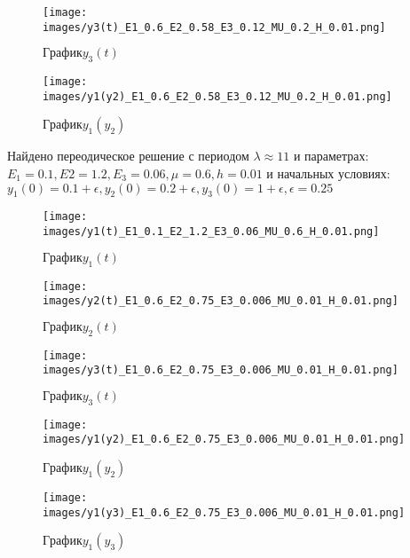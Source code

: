 \documentclass[a4paper,12pt,titlepage,finall]{article}
\begin{document}
\begin{itemize}
\newpage
\begin{figure}[h]
    \centering
    \texttt{[image: images/y3(t)\_E1\_0.6\_E2\_0.58\_E3\_0.12\_MU\_0.2\_H\_0.01.png]}
    \caption{$График y_3(t)$}
    \label{fig:my_label}
\end{figure}

\begin{figure}[h]
    \centering
    \texttt{[image: images/y1(y2)\_E1\_0.6\_E2\_0.58\_E3\_0.12\_MU\_0.2\_H\_0.01.png]}
    \caption{$График y_1(y_2)$}
    \label{fig:my_label}
\end{figure}

\newpage
Найдено переодическое решение с периодом $\lambda \approx 11$ и параметрах:
$E_1 = 0.1, E2 = 1.2, E_3 = 0.06, \mu = 0.6, h = 0.01$ и начальных условиях: \newline
$y_1(0) = 0.1 + \epsilon, y_2(0) = 0.2 + \epsilon, y_3(0)= 1 + \epsilon, \epsilon = 0.25$

\begin{figure}[h]
    \centering
    \texttt{[image: images/y1(t)\_E1\_0.1\_E2\_1.2\_E3\_0.06\_MU\_0.6\_H\_0.01.png]}
    \caption{$График y_1(t)$}
    \label{fig:my_label}
\end{figure}

\begin{figure}[h]
    \centering
    \texttt{[image: images/y2(t)\_E1\_0.6\_E2\_0.75\_E3\_0.006\_MU\_0.01\_H\_0.01.png]}
    \caption{$График y_2(t)$}
    \label{fig:my_label}
\end{figure}

\newpage

\begin{figure}[h]
    \centering
    \texttt{[image: images/y3(t)\_E1\_0.6\_E2\_0.75\_E3\_0.006\_MU\_0.01\_H\_0.01.png]}
    \caption{$График y_3(t)$}
    \label{fig:my_label}
\end{figure}


\begin{figure}[h]
    \centering
    \texttt{[image: images/y1(y2)\_E1\_0.6\_E2\_0.75\_E3\_0.006\_MU\_0.01\_H\_0.01.png]}
    \caption{$График y_1(y_2)$}
    \label{fig:my_label}
\end{figure}

\newpage

\begin{figure}[h]
    \centering
    \texttt{[image: images/y1(y3)\_E1\_0.6\_E2\_0.75\_E3\_0.006\_MU\_0.01\_H\_0.01.png]}
    \caption{$График y_1(y_3)$}
    \label{fig:my_label}
\end{figure}



\end{itemize}
\end{document}

